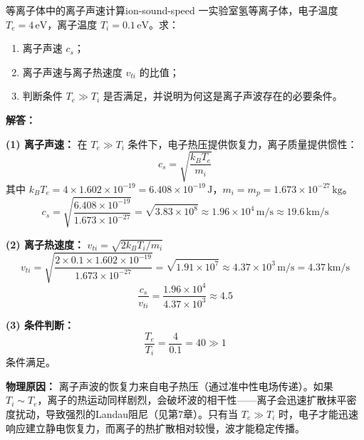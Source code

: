 \begin{example}{等离子体中的离子声速计算}{ion-sound-speed}
一实验室氢等离子体，电子温度 $T_e=4\,\mathrm{eV}$，离子温度 $T_i=0.1\,\mathrm{eV}$。求：
\begin{enumerate}[label=(\arabic*)]
\item 离子声速 $c_s$；
\item 离子声速与离子热速度 $v_{ti}$ 的比值；
\item 判断条件 $T_e\gg T_i$ 是否满足，并说明为何这是离子声波存在的必要条件。
\end{enumerate}
\tcblower
\textbf{解答：}

\textbf{(1) 离子声速：} 在 $T_e\gg T_i$ 条件下，电子热压提供恢复力，离子质量提供惯性：
\[
c_s = \sqrt{\frac{k_{\!B}T_e}{m_i}}
\]
其中 $k_{\!B}T_e = 4\times 1.602\times 10^{-19} = 6.408\times 10^{-19}\,\mathrm{J}$，$m_i = m_p = 1.673\times 10^{-27}\,\mathrm{kg}$。
\[
c_s = \sqrt{\frac{6.408\times 10^{-19}}{1.673\times 10^{-27}}} = \sqrt{3.83\times 10^8} \approx 1.96\times 10^4\,\mathrm{m/s} \approx 19.6\,\mathrm{km/s}
\]

\textbf{(2) 离子热速度：} $v_{ti} = \sqrt{2k_{\!B}T_i/m_i}$
\[
v_{ti} = \sqrt{\frac{2\times 0.1\times 1.602\times 10^{-19}}{1.673\times 10^{-27}}} = \sqrt{1.91\times 10^7} \approx 4.37\times 10^3\,\mathrm{m/s} = 4.37\,\mathrm{km/s}
\]
\[
\frac{c_s}{v_{ti}} = \frac{1.96\times 10^4}{4.37\times 10^3} \approx 4.5
\]

\textbf{(3) 条件判断：}
\[
\frac{T_e}{T_i} = \frac{4}{0.1} = 40 \gg 1
\]
条件满足。

\textbf{物理原因：} 离子声波的恢复力来自电子热压（通过准中性电场传递）。如果 $T_i\sim T_e$，离子的热运动同样剧烈，会破坏波的相干性——离子会迅速扩散抹平密度扰动，导致强烈的Landau阻尼（见第7章）。只有当 $T_e\gg T_i$ 时，电子才能迅速响应建立静电恢复力，而离子的热扩散相对较慢，波才能稳定传播。
\end{example}

